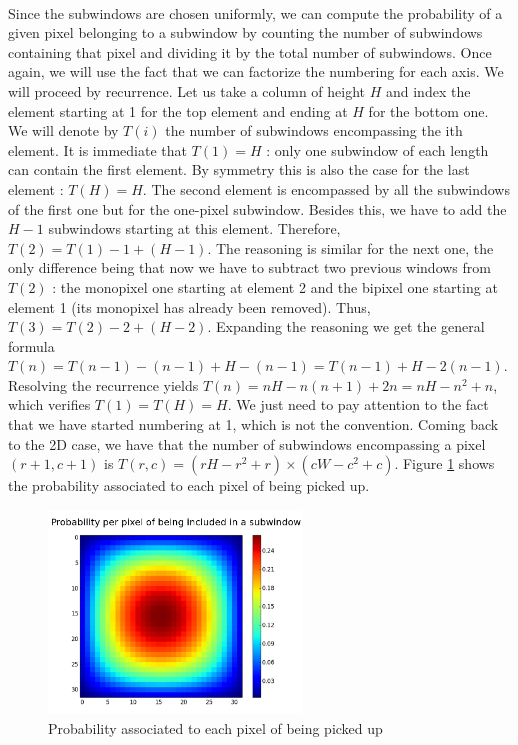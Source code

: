 \documentclass[a4paper]{report}
\begin{document}
		\paragraph{}
		Since the subwindows are chosen uniformly, we can compute the probability of a given pixel belonging to a subwindow by counting the number of subwindows containing that pixel and dividing it by the total number of subwindows. Once again, we will use the fact that we can factorize the numbering for each axis. We will proceed by recurrence. Let us take a column of height $H$ and index the element starting at 1 for the top element and ending at $H$ for the bottom one. We will denote by $T(i)$ the number of subwindows encompassing the ith element. It is immediate that $T(1) = H$ : only one subwindow of each length can contain the first element. By symmetry this is also the case for the last element : $T(H) = H$. The second element is encompassed by all the subwindows of the first one but for the one-pixel subwindow. Besides this, we have to add the $H-1$ subwindows starting at this element. Therefore, $T(2) = T(1) - 1 + (H -1)$. The reasoning is similar for the next one, the only difference being that now we have to subtract two previous windows from $T(2)$ : the monopixel one starting at element 2 and the bipixel one starting at element 1 (its monopixel has already been removed). Thus, $T(3) = T(2) - 2 + (H - 2)$. Expanding the reasoning we get the general formula $T(n) = T(n-1) - (n-1) + H - (n-1) = T(n-1) + H - 2(n-1)$. Resolving the recurrence yields $T(n) = nH - n(n+1) + 2n = nH -n^2 + n$, which verifies $T(1) = T(H) = H$. We just need to pay attention to the fact that we have started numbering at 1, which is not the convention.
		Coming back to the 2D case, we have that the number of subwindows encompassing a pixel $(r+1,c+1)$ is $T(r,c) = (rH - r^2 + r) \times (cW - c^2 + c)$.
		Figure \ref{fig:probpixel} shows the probability associated to each pixel of being picked up.
		
	\begin{figure}
		\centering
			\includegraphics[width=0.6\textwidth]{images/probpixel.png}
		\caption{\label{fig:probpixel}Probability associated to each pixel of being picked up}
	\end{figure}
		
\end{document}
